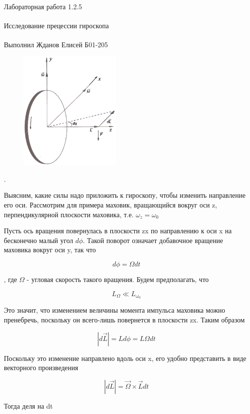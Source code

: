 \documentclass{astroedu-lab}
\begin{document}
\begin{problem}{\huge Лабораторная работа 1.2.5\\\\Исследование прецессии гироскопа\\\\Выполнил Жданов Елисей Б01-205}
\begin{figure}
\includegraphics[width=0.45\textwidth]{theory_1.png}
\caption{}
\label{ris:image}
\end{figure}.

Выясним, какие силы надо приложить к гироскопу, чтобы изменить направление его оси. Рассмотрим для примера маховик, вращающийся вокруг оси z, перпендикулярной плоскости маховика, т.е. $\omega_z = \omega_0$

Пусть ось вращения повернулась в плоскости zx по направлению к оси x на бесконечно малый угол $d \phi$. Такой поворот означает добавочное вращение маховика вокруг оси y, так что

\begin{equation}
	d \phi = \Omega d t
\end{equation}

, где $\Omega$ - угловая скорость такого вращения. Будем предполагать, что

\begin{equation}
	L_{\Omega} \ll L_{\omega_0} \tag{1}
\end{equation}

Это значит, что изменением величины момента импульса маховика можно пренебречь, поскольку он всего-лишь повернется в плоскости zx. Таким образом

\begin{equation}
	|d \vec L| = L d \phi = L \Omega d t
\end{equation}

Поскольку это изменение направлено вдоль оси x, его удобно представить в виде векторного произведения

\begin{equation}
	|d \vec L| = \vec \Omega \times \vec L dt
\end{equation}

Тогда деля на dt


\end{problem}
\end{document}
